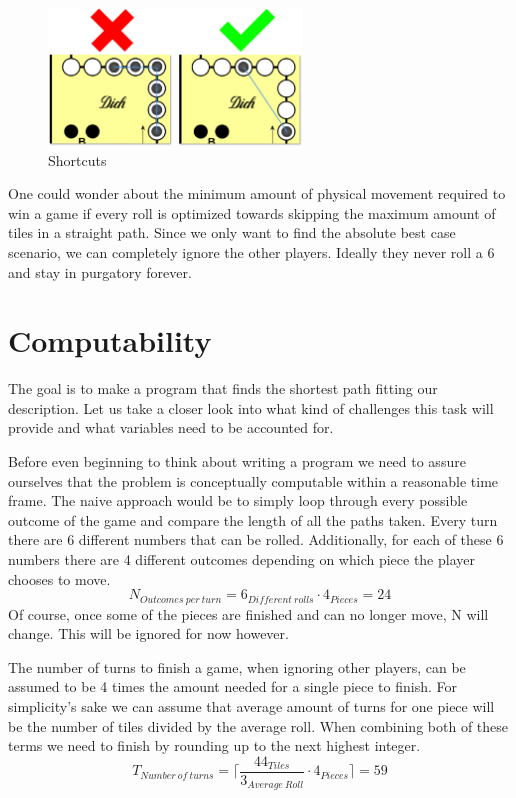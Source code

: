 \documentclass[12pt]{article} %
\begin{document}
\begin{figure}[htbp]
    \centering
    \includegraphics[width=0.6\textwidth]{images/Figure2}
    \caption{Shortcuts}
    \label{fig:shortcuts}
\end{figure}

One could wonder about the minimum amount of physical movement required to win a game if every roll is optimized towards skipping the maximum amount of tiles in a straight path. Since we only want to find the absolute best case scenario, we can completely ignore the other players. Ideally they never roll a 6 and stay in purgatory forever.


\section{Computability}\label{sec:computability}
The goal is to make a program that finds the shortest path fitting our description. Let us take a closer look into what kind of challenges this task will provide and what variables need to be accounted for.

Before even beginning to think about writing a program we need to assure ourselves that the problem is conceptually computable within a reasonable time frame.
The naive approach would be to simply loop through every possible outcome of the game and compare the length of all the paths
taken.
Every turn there are 6 different numbers that can be rolled. Additionally, for each of these 6 numbers there are 4 different outcomes depending on which piece the player chooses to move.
\[
    N_{Outcomes~per~turn} = 6_{Different~rolls} \cdot 4_{Pieces} = 24
\]
Of course, once some of the pieces are finished and can no longer move, N will change. This will be ignored for now however.

The number of turns to finish a game, when ignoring other players, can be assumed to be 4 times the amount needed for a single piece to finish. For simplicity's sake we can assume that average amount of turns for one piece will be the number of tiles divided by the average roll. When combining both of these terms we need to finish by rounding up to the next highest integer.
\[
    T_{Number~of~turns} =  \lceil \frac{44_{Tiles}}{3_{Average~Roll}} \cdot 4_{Pieces} \rceil
    =  59
\]
\end{document}
